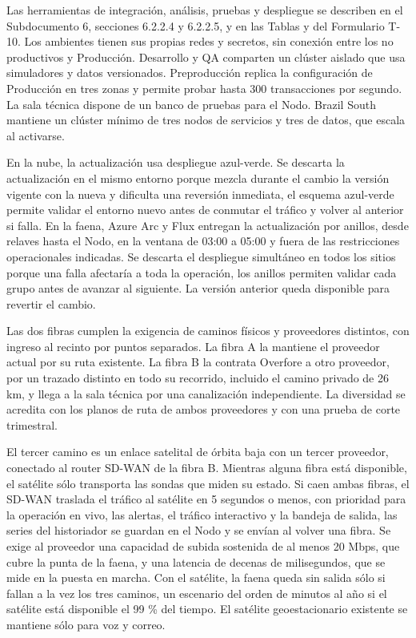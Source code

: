 \documentclass[subdoc]{../../comun/overfore}
\begin{document}
Las herramientas de integración, análisis, pruebas y despliegue se describen en el Subdocumento 6, secciones 6.2.2.4 y 6.2.2.5, y en las Tablas  y  del Formulario T-10. Los ambientes tienen sus propias redes y secretos, sin conexión entre los no productivos y Producción. Desarrollo y QA comparten un clúster aislado que usa simuladores y datos versionados. Preproducción replica la configuración de Producción en tres zonas y permite probar hasta 300 transacciones por segundo. La sala técnica dispone de un banco de pruebas para el Nodo. Brazil South mantiene un clúster mínimo de tres nodos de servicios y tres de datos, que escala al activarse.

En la nube, la actualización usa despliegue azul-verde. Se descarta la actualización en el mismo entorno porque mezcla durante el cambio la versión vigente con la nueva y dificulta una reversión inmediata, el esquema azul-verde permite validar el entorno nuevo antes de conmutar el tráfico y volver al anterior si falla. En la faena, Azure Arc y Flux entregan la actualización por anillos, desde relaves hasta el Nodo, en la ventana de 03:00 a 05:00 y fuera de las restricciones operacionales indicadas. Se descarta el despliegue simultáneo en todos los sitios porque una falla afectaría a toda la operación, los anillos permiten validar cada grupo antes de avanzar al siguiente. La versión anterior queda disponible para revertir el cambio.

Las dos fibras cumplen la exigencia de caminos físicos y proveedores distintos, con ingreso al recinto por puntos separados. La fibra A la mantiene el proveedor actual por su ruta existente. La fibra B la contrata Overfore a otro proveedor, por un trazado distinto en todo su recorrido, incluido el camino privado de 26 km, y llega a la sala técnica por una canalización independiente. La diversidad se acredita con los planos de ruta de ambos proveedores y con una prueba de corte trimestral.

El tercer camino es un enlace satelital de órbita baja con un tercer proveedor, conectado al router SD-WAN de la fibra B. Mientras alguna fibra está disponible, el satélite sólo transporta las sondas que miden su estado. Si caen ambas fibras, el SD-WAN traslada el tráfico al satélite en 5 segundos o menos, con prioridad para la operación en vivo, las alertas, el tráfico interactivo y la bandeja de salida, las series del historiador se guardan en el Nodo y se envían al volver una fibra. Se exige al proveedor una capacidad de subida sostenida de al menos 20 Mbps, que cubre la punta de la faena, y una latencia de decenas de milisegundos, que se mide en la puesta en marcha. Con el satélite, la faena queda sin salida sólo si fallan a la vez los tres caminos, un escenario del orden de minutos al año si el satélite está disponible el 99 \% del tiempo. El satélite geoestacionario existente se mantiene sólo para voz y correo.
\end{document}
